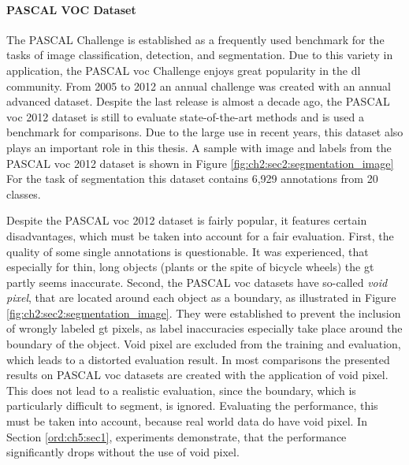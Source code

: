 \paragraph{PASCAL VOC Dataset}

The PASCAL  Challenge \cite{Eve20-PascalVOC} is established as a frequently used benchmark for the tasks of image classification, detection, and segmentation.
Due to this variety in application, the PASCAL \gls{voc} Challenge enjoys great popularity in the \gls{dl} community.
From 2005 to 2012 an annual challenge was created with an annual advanced dataset.
Despite the last release is almost a decade ago, the PASCAL \gls{voc} 2012 dataset is still to evaluate state-of-the-art methods and is used a benchmark for comparisons.
Due to the large use in recent years, this dataset also plays an important role in this thesis.
A sample with image and labels from the PASCAL \gls{voc} 2012 dataset is shown in Figure \ref{fig:ch2:sec2:segmentation_image}
For the task of segmentation this dataset contains 6,929 annotations from 20 classes.

Despite the PASCAL \gls{voc} 2012 dataset is fairly popular, it features certain disadvantages, which must be taken into account for a fair evaluation.
First, the quality of some single annotations is questionable.
It was experienced, that especially for thin, long objects (\eg plants or the spite of bicycle wheels) the \gls{gt} partly seems inaccurate.
Second, the PASCAL \gls{voc} datasets have so-called \textit{void pixel}, that are located around each object as a boundary, as illustrated in Figure \ref{fig:ch2:sec2:segmentation_image}.
They were established to prevent the inclusion of wrongly labeled \gls{gt} pixels, as label inaccuracies especially take place around the boundary of the object.  
Void pixel are excluded from the training and evaluation, which leads to a distorted evaluation result.
In most comparisons the presented results on PASCAL \gls{voc} datasets are created with the application of void pixel.
This does not lead to a realistic evaluation, since the boundary, which is particularly difficult to segment, is ignored.
Evaluating the performance, this must be taken into account, because real world data do have void pixel. 
In Section \ref{ord:ch5:sec1}, experiments demonstrate, that the performance significantly drops without the use of void pixel.


